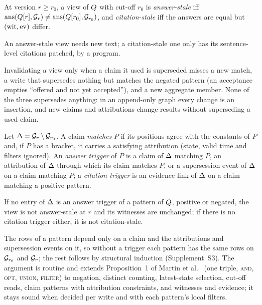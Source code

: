 \begin{definition}
At version $r\ge r_0$, a view of $Q$ with cut-off $r_0$ is \emph{answer-stale} iff
$\mathrm{ans}(Q[r],\mathcal G_r)\neq\mathrm{ans}(Q[r_0],\mathcal G_{r_0})$, and \emph{citation-stale} iff the
answers are equal but $(\mathrm{wit},\mathrm{ev})$ differ.
\end{definition}

\noindent An answer-stale view needs new text; a citation-stale one only has its sentence-level
citations patched, by a program.

\begin{observation}
Invalidating a view only when a claim it used is superseded misses a new match, a write that
supersedes nothing but matches the negated pattern (an acceptance empties ``offered and not yet
accepted''), and a new aggregate member. None of the three supersedes anything: in an
append-only graph every change is an insertion, and new claims and attributions change results
without superseding a used claim.
\end{observation}

\noindent Let $\Delta=\mathcal G_r\setminus\mathcal G_{r_0}$. A claim \emph{matches} $P$ if its positions agree
with the constants of $P$ and, if $P$ has a bracket, it carries a satisfying attribution (state,
valid time and filters ignored). An \emph{answer trigger} of $P$ is a claim of $\Delta$ matching
$P$, an attribution of $\Delta$ through which its claim matches $P$, or a supersession event of
$\Delta$ on a claim matching $P$; a \emph{citation trigger} is an evidence link of $\Delta$ on a claim
matching a positive pattern.

\begin{proposition}[Soundness]\label{prop:soundness}
If no entry of $\Delta$ is an answer trigger of a pattern of $Q$, positive or negated, the view is
not answer-stale at $r$ and its witnesses are unchanged; if there is no citation trigger either,
it is not citation-stale.
\end{proposition}

\noindent The rows of a pattern depend only on a claim and the attributions and supersession
events on it, so without a trigger each pattern has the same rows on $\mathcal G_{r_0}$ and $\mathcal G_r$; the
rest follows by structural induction (Supplement~S3). The argument is routine and extends
Proposition~1 of Martin et al.~\cite{martin2010caching} (one triple, \textsc{and}, \textsc{opt},
\textsc{union}, \textsc{filter}) to negation, distinct counting, latest-state selection, cut-off
reads, claim patterns with attribution constraints, and witnesses and evidence; it stays sound
when decided per write and with each pattern's local filters.

